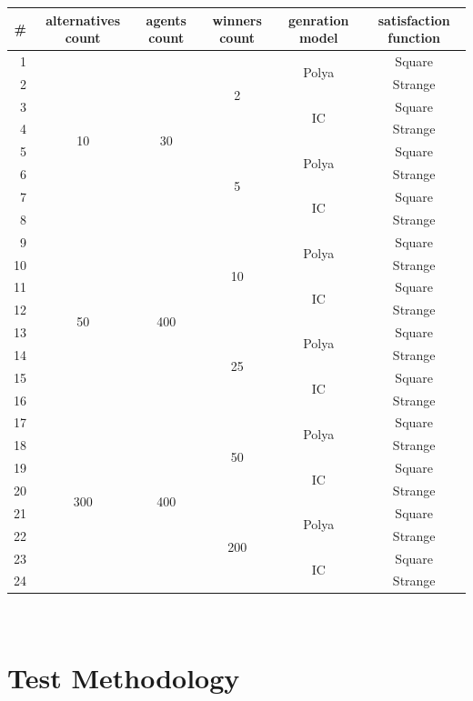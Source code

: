 \begin{tabular}{r | c | c | c | c | c |}
	\# & alternatives count & agents count & winners count & genration model & satisfaction function \\
	\hline
	1 & \multirow{8}{*}{10} & \multirow{8}{*}{30} & \multirow{4}{*}{2} & \multirow{2}{*}{Polya} & Square \\
	2 & & & & & Strange \\
	\cline{5-6}
	3 & & & & \multirow{2}{*}{IC} & Square \\
	4 & & & & & Strange \\
	\cline{4-6}
	5 & & & \multirow{4}{*}{5} & \multirow{2}{*}{Polya} & Square \\
	6 & & & & & Strange \\
	\cline{5-6}
	7 & & & & \multirow{2}{*}{IC} & Square \\
	8 & & & & & Strange \\
	\hline
	9 & \multirow{8}{*}{50} & \multirow{8}{*}{400} & \multirow{4}{*}{10} & \multirow{2}{*}{Polya} & Square \\
	10 & & & & & Strange \\
	\cline{5-6}
	11 & & & & \multirow{2}{*}{IC} & Square \\
	12 & & & & & Strange \\
	\cline{4-6}
	13 & & & \multirow{4}{*}{25} & \multirow{2}{*}{Polya} & Square \\
	14 & & & & & Strange \\
	\cline{5-6}
	15 & & & & \multirow{2}{*}{IC} & Square \\
	16 & & & & & Strange \\
	\hline
	17 & \multirow{8}{*}{300} & \multirow{8}{*}{400} & \multirow{4}{*}{50} & \multirow{2}{*}{Polya} & Square \\
	18 & & & & & Strange \\
	\cline{5-6}
	19 & & & & \multirow{2}{*}{IC} & Square \\
	20 & & & & & Strange \\
	\cline{4-6}
	21 & & & \multirow{4}{*}{200} & \multirow{2}{*}{Polya} & Square \\
	22 & & & & & Strange \\
	\cline{5-6}
	23 & & & & \multirow{2}{*}{IC} & Square \\
	24 & & & & & Strange \\
	\hline
\end{tabular}
\\

\section{Test Methodology}

